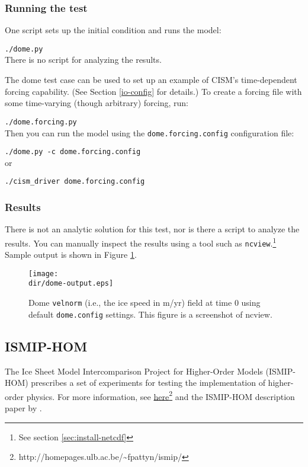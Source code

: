 \subsubsection{Running the test}
One script sets up the initial condition and runs the model:

\texttt{./dome.py}\\

\noindent
There is no script for analyzing the results.

\par
The dome test case can be used to set up an example of CISM's time-dependent
forcing capability.  (See Section \ref{io-config} for details.)
To create a forcing file with some time-varying (though arbitrary) forcing, run:

\texttt{./dome.forcing.py}\\

\noindent
Then you can run the model using the \texttt{dome.forcing.config} configuration file:

\texttt{./dome.py -c dome.forcing.config}\\

\noindent
or

\texttt{./cism\_driver dome.forcing.config}\\

\subsubsection{Results}
There is not an analytic solution for this test, nor is there a script to analyze
the results.  You can manually inspect the results using a tool such as \texttt{ncview}.\footnote{See section \ref{sec:install-netcdf}}
Sample output is shown in Figure \ref{fig:domeresults}.
\begin{figure}[H!]
	\centering
	\texttt{[image: \\dir/dome-output.eps]}
	\caption{Dome \texttt{velnorm} (i.e., the ice speed in m/yr) field at time 0 using default \texttt{dome.config} settings. This figure is a screenshot of ncview.}
	\label{fig:domeresults}
\end{figure}
\FloatBarrier

\subsection{ISMIP-HOM}
The Ice Sheet Model Intercomparison Project for Higher-Order Models (ISMIP-HOM)
prescribes a set of experiments for testing the implementation of higher-order physics.  
For more information, see 
\href{http://homepages.ulb.ac.be/~fpattyn/ismip/}{here}\footnote{http://homepages.ulb.ac.be/\textasciitilde{}fpattyn/ismip/} 
and the ISMIP-HOM description paper by \citet{Pattyn2008}.

